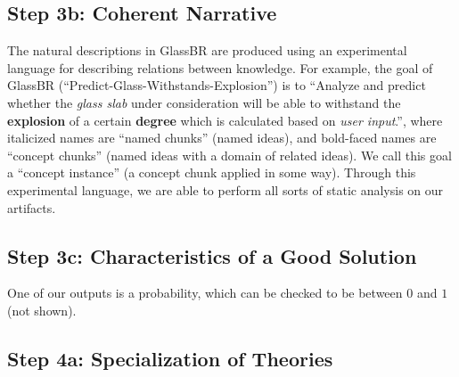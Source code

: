 \documentclass[sigconf,review,anonymous=false]{acmart}
\begin{document}
\subsection*{Step 3b: Coherent Narrative}


The natural descriptions in GlassBR are produced using an experimental language 
for describing relations between knowledge. For example, the goal of GlassBR 
(``Predict-Glass-Withstands-Explosion'') is to ``Analyze and predict whether 
the \textit{glass slab} under consideration will be able to withstand the 
\textbf{explosion} of a certain \textbf{degree} which is calculated based on
\textit{user input}.'', where italicized names are ``named chunks'' (named ideas), 
and bold-faced names are ``concept chunks'' (named ideas with a domain of related 
ideas). We call this goal a ``concept instance'' (a concept chunk applied in 
some way). Through this experimental language, we are able to perform all sorts 
of static analysis on our artifacts.

% 
% 

\subsection*{Step 3c: Characteristics of a Good Solution}

One of our outputs is a probability, which can be checked to be between $0$ and $1$
(not shown).

\subsection*{Step 4a: Specialization of Theories}
\end{document}
